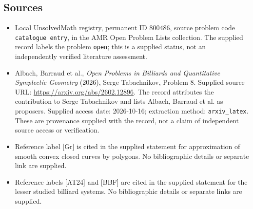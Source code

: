 \documentclass[11pt]{article}
\begin{document}
\subsection{Sources}
\begin{itemize}
\item Local UnsolvedMath registry, permanent ID \(800486\), source problem code \texttt{catalogue entry}, in the AMR Open Problem Lists collection. The supplied record labels the problem \texttt{open}; this is a supplied status, not an independently verified literature assessment.
\item Albach, Barraud et al., \emph{Open Problems in Billiards and Quantitative Symplectic Geometry} (2026), Serge Tabachnikov, Problem 8. Supplied source URL: \url{https://arxiv.org/abs/2602.12896}. The record attributes the contribution to Serge Tabachnikov and lists Albach, Barraud et al. as proposers. Supplied access date: 2026-10-16; extraction method: \texttt{arxiv\_latex}. These are provenance supplied with the record, not a claim of independent source access or verification.
\item Reference label [Gr] is cited in the supplied statement for approximation of smooth convex closed curves by polygons. No bibliographic details or separate link are supplied.
\item Reference labels [AT24] and [BBF] are cited in the supplied statement for the lesser studied billiard systems. No bibliographic details or separate links are supplied.
\end{itemize}
\end{document}
